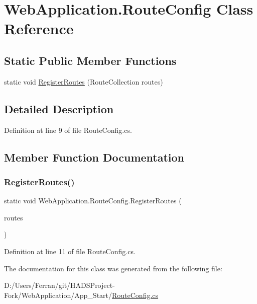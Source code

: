 \hypertarget{classWebApplication_1_1RouteConfig}{}\section{Web\+Application.\+Route\+Config Class Reference}
\label{classWebApplication_1_1RouteConfig}
\subsection*{Static Public Member Functions}
\begin{DoxyCompactItemize}
\item 
static void \mbox{\hyperlink{classWebApplication_1_1RouteConfig_a085a3963cf9c9d23bef7dd7c45601d8a}{Register\+Routes}} (Route\+Collection routes)
\end{DoxyCompactItemize}


\subsection{Detailed Description}


Definition at line 9 of file Route\+Config.\+cs.



\subsection{Member Function Documentation}
\mbox{\label{classWebApplication_1_1RouteConfig_a085a3963cf9c9d23bef7dd7c45601d8a}} 
\subsubsection{\texorpdfstring{RegisterRoutes()}{RegisterRoutes()}}
{\footnotesize\ttfamily static void Web\+Application.\+Route\+Config.\+Register\+Routes (\begin{DoxyParamCaption}\item[{Route\+Collection}]{routes }\end{DoxyParamCaption})\hspace{0.3cm}{\ttfamily [static]}}



Definition at line 11 of file Route\+Config.\+cs.



The documentation for this class was generated from the following file\+:\begin{DoxyCompactItemize}
\item 
D\+:/\+Users/\+Ferran/git/\+H\+A\+D\+S\+Project-\/\+Fork/\+Web\+Application/\+App\+\_\+\+Start/\mbox{\hyperlink{RouteConfig_8cs}{Route\+Config.\+cs}}\end{DoxyCompactItemize}
